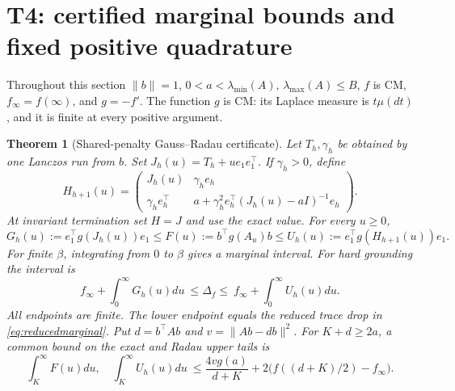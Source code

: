 \documentclass[11pt]{article}
\newtheorem{theorem}{Theorem}
\begin{document}
\section{T4: certified marginal bounds and fixed positive quadrature}
Throughout this section $\|b\|=1$, $0<a<\lambda_{\min}(A)$,
$\lambda_{\max}(A)\leq B$, $f$ is CM, $f_\infty=f(\infty)$,
and $g=-f'$. The function $g$ is CM: its Laplace measure is
$t\mu(dt)$, and it is finite at every positive argument.

\begin{theorem}[Shared-penalty Gauss--Radau certificate]\label{thm:radau}
Let $T_h,\gamma_h$ be obtained by one Lanczos run from $b$.
Set $J_h(u)=T_h+ue_1e_1^\top$. If $\gamma_h>0$, define
\begin{equation}\label{eq:radau}
 H_{h+1}(u)=
 \begin{pmatrix}
 J_h(u)&\gamma_h e_h\\
 \gamma_h e_h^\top&a+\gamma_h^2 e_h^\top(J_h(u)-aI)^{-1}e_h
 \end{pmatrix}.
\end{equation}
At invariant termination set $H=J$ and use the exact value.
For every $u\geq0$,
\[
 G_h(u):=e_1^\top g(J_h(u))e_1
 \leq F(u):=b^\top g(A_u)b
 \leq U_h(u):=e_1^\top g(H_{h+1}(u))e_1.
\]
For finite $\beta$, integrating from $0$ to $\beta$ gives a marginal
interval. For hard grounding the interval is
\[
 f_\infty+\int_0^\infty G_h(u)du
 \ \leq\Delta_f\leq\
 f_\infty+\int_0^\infty U_h(u)du.
\]
All endpoints are finite. The lower endpoint equals the reduced trace
drop in \eqref{eq:reducedmarginal}. Put
$d=b^\top Ab$ and $v=\|Ab-db\|^2$. For $K+d\geq2a$, a common bound
on the exact and Radau upper tails is
\begin{equation}\label{eq:penaltytail}
 \int_K^\infty F(u)du,\quad\int_K^\infty U_h(u)du
 \ \leq\frac{4v g(a)}{d+K}
                 +2\bigl(f((d+K)/2)-f_\infty\bigr).
\end{equation}
\end{theorem}
\end{document}
